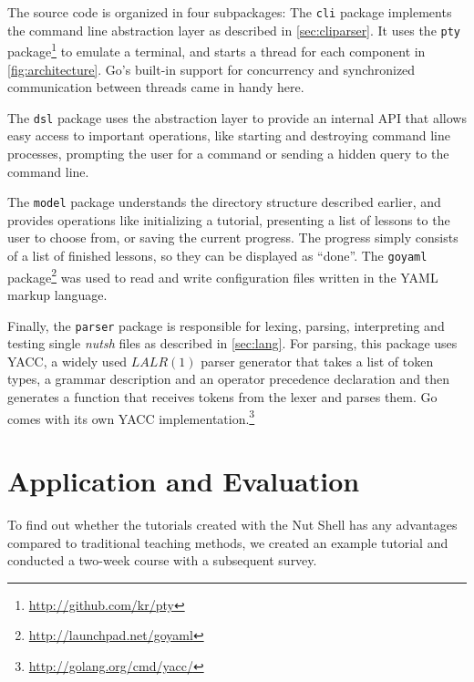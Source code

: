 \documentclass[paper=a4,twoside,abstract=on,cleardoublepage=empty,numbers=noenddot,toc=bib,toc=listof,12pt,appendixprefix=true]{scrreprt}
\begin{document}
The source code is organized in four subpackages: The \texttt{cli} package implements the command line abstraction layer as described in \cref{sec:cliparser}. It uses the \texttt{pty} package\footnote{\url{http://github.com/kr/pty}} to emulate a terminal, and starts a thread for each component in \cref{fig:architecture}. Go's built-in support for concurrency and synchronized communication between threads came in handy here.

The \texttt{dsl} package uses the abstraction layer to provide an internal API that allows easy access to important operations, like starting and destroying command line processes, prompting the user for a command or sending a hidden query to the command line.

The \texttt{model} package understands the directory structure described earlier, and provides operations like initializing a tutorial, presenting a list of lessons to the user to choose from, or saving the current progress. The progress simply consists of a list of finished lessons, so they can be displayed as “done”. The \texttt{goyaml} package\footnote{\url{http://launchpad.net/goyaml}} was used to read and write configuration files written in the \textsc{YAML} markup language.

Finally, the \texttt{parser} package is responsible for lexing, parsing, interpreting and testing single \emph{nutsh} files as described in \cref{sec:lang}. For parsing, this package uses \textsc{YACC}, a widely used $LALR(1)$ parser generator that takes a list of token types, a grammar description and an operator precedence declaration and then generates a function that receives tokens from the lexer and parses them. Go comes with its own YACC implementation.\footnote{\url{http://golang.org/cmd/yacc/}}


%
%

\chapter{Application and Evaluation}
\label{sec:evaluation}

To find out whether the tutorials created with the Nut Shell has any advantages compared to traditional teaching methods, we created an example tutorial and conducted a two-week course with a subsequent survey.
\end{document}
